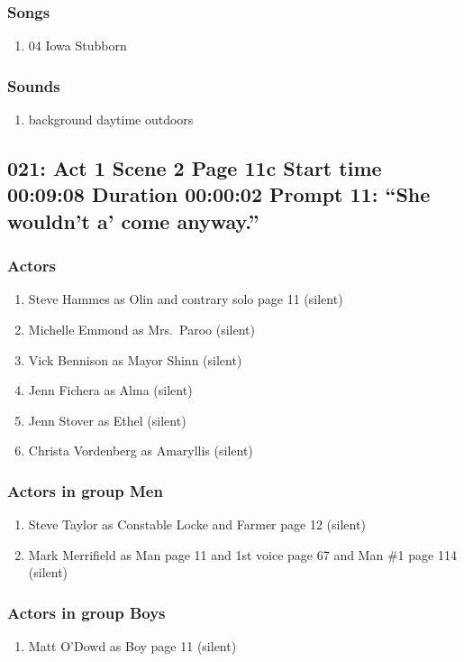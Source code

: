 \subsubsection{Songs}
\begin{enumerate}
\item 04 Iowa Stubborn
\end{enumerate}\subsubsection{Sounds}
\begin{enumerate}
\item background daytime outdoors
\end{enumerate}
\subsection{021: Act 1 Scene 2 Page 11c Start time 00:09:08 Duration 00:00:02 Prompt 11: ``She wouldn't a' come anyway.''}

\subsubsection{Actors}
\begin{enumerate}
\item Steve Hammes as Olin and contrary solo page 11 (silent)
\item Michelle Emmond as Mrs.~Paroo (silent)
\item Vick Bennison as Mayor Shinn (silent)
\item Jenn Fichera as Alma (silent)
\item Jenn Stover as Ethel (silent)
\item Christa Vordenberg as Amaryllis (silent)
\end{enumerate}
\subsubsection{Actors in group Men}
\begin{enumerate}
\item Steve Taylor as Constable Locke and Farmer page 12 (silent)
\item Mark Merrifield as Man page 11 and 1st voice page 67 and Man \#1 page 114 (silent)
\end{enumerate}
\subsubsection{Actors in group Boys}
\begin{enumerate}
\item Matt O'Dowd as Boy page 11 (silent)
\end{enumerate}
